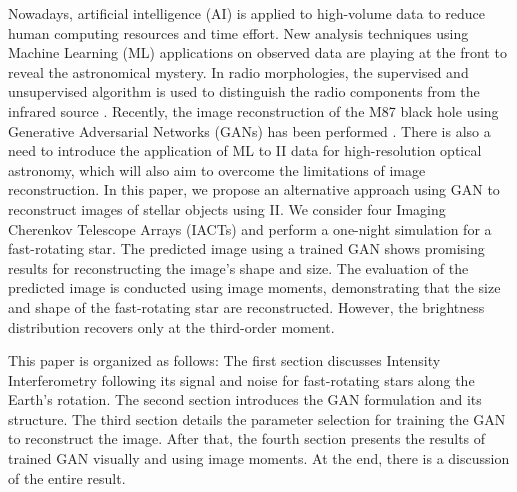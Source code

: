 Nowadays, artificial intelligence (AI) is applied to high-volume data to reduce human computing resources and time effort. New analysis techniques using Machine Learning (ML) applications on observed data are playing at the front to reveal the astronomical mystery. In radio morphologies, the supervised and unsupervised algorithm is used to distinguish the radio components from the infrared source \citep{wu2019radio, galvin2020cataloguing}. Recently, the image reconstruction of the M87 black hole using Generative Adversarial Networks (GANs) has been performed \citep{10.1093/mnras/stad3797}. There is also a need to introduce the application of ML to II data for high-resolution optical astronomy, which will also aim to overcome the limitations of image reconstruction. In this paper, we propose an alternative approach using GAN \citep{goodfellow2014generative} to reconstruct images of stellar objects using II. We consider four Imaging Cherenkov Telescope Arrays (IACTs) and perform a one-night simulation for a fast-rotating star. The predicted image using a trained GAN shows promising results for reconstructing the image's shape and size. The evaluation of the predicted image is conducted using image moments, demonstrating that the size and shape of the fast-rotating star are reconstructed. However, the brightness distribution recovers only at the third-order moment.

This paper is organized as follows: The first section discusses Intensity Interferometry following its signal and noise for fast-rotating stars along the Earth's rotation. The second section introduces the GAN formulation and its structure. The third section details the parameter selection for training the GAN to reconstruct the image. After that, the fourth section presents the results of trained GAN visually and using image moments. At the end, there is a discussion of the entire result.